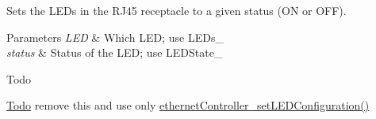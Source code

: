 Sets the L\+E\+Ds in the R\+J45 receptacle to a given status (ON or O\+FF). 


\begin{DoxyParams}{Parameters}
{\em L\+ED} & Which L\+ED; use L\+E\+Ds\+\_\+ \\
\hline
{\em status} & Status of the L\+ED; use L\+E\+D\+State\+\_\+ \\
\hline
\end{DoxyParams}
\begin{DoxyRefDesc}{Todo}
\item[\mbox{\hyperlink{todo__todo000010}{Todo}}]remove this and use only \mbox{\hyperlink{group__leds_ga3ec0343a266cb8a4925097d708dd96f4}{ethernet\+Controller\+\_\+set\+L\+E\+D\+Configuration()}} \end{DoxyRefDesc}
